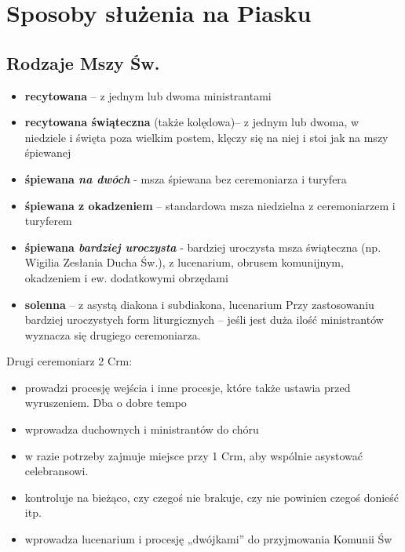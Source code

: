 
\section{Sposoby służenia na Piasku}

	\subsection{Rodzaje Mszy Św.}
		
		\begin{itemize}
			\item \textbf{recytowana} – z jednym lub dwoma ministrantami
			\item \textbf{recytowana świąteczna} (także kolędowa)– z jednym lub dwoma, w
			niedziele i święta poza wielkim postem, klęczy się na niej i stoi jak na mszy
			śpiewanej
			\item \textbf{śpiewana \textit{na dwóch}} - msza śpiewana bez ceremoniarza i turyfera
			\item \textbf{śpiewana z okadzeniem} – standardowa msza niedzielna z
			ceremoniarzem i turyferem
			\item \textbf{ śpiewana \textit{bardziej uroczysta}} - bardziej uroczysta msza świąteczna
			(np. Wigilia Zesłania Ducha Św.), z lucenarium, obrusem komunijnym,
			okadzeniem i ew. dodatkowymi obrzędami
			\item \textbf{solenna} – z asystą diakona i subdiakona, lucenarium
			Przy zastosowaniu bardziej uroczystych form liturgicznych – jeśli jest duża ilość
			ministrantów wyznacza się drugiego ceremoniarza.
		\end{itemize}
	
		Drugi ceremoniarz 2 Crm:
		
		\begin{itemize}
			\item prowadzi procesję wejścia i inne procesje, które także ustawia przed
			wyruszeniem. Dba o dobre tempo
			\item wprowadza duchownych i ministrantów do chóru
			\item w razie potrzeby zajmuje miejsce przy 1 Crm, aby wspólnie asystować
			celebransowi.
			\item kontroluje na bieżąco, czy czegoś nie brakuje, czy nie powinien czegoś
			donieść itp.
			\item wprowadza lucenarium i procesję „dwójkami” do przyjmowania Komunii Św
		\end{itemize}
		